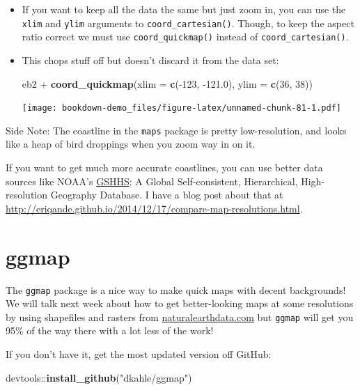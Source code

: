 \documentclass[]{book}
\newenvironment{Shaded}{\begin{snugshade}}{\end{snugshade}}
\newcommand{\KeywordTok}[1]{\textcolor[rgb]{0.13,0.29,0.53}{\textbf{{#1}}}}
\newcommand{\DataTypeTok}[1]{\textcolor[rgb]{0.13,0.29,0.53}{{#1}}}
\newcommand{\DecValTok}[1]{\textcolor[rgb]{0.00,0.00,0.81}{{#1}}}
\newcommand{\FloatTok}[1]{\textcolor[rgb]{0.00,0.00,0.81}{{#1}}}
\newcommand{\StringTok}[1]{\textcolor[rgb]{0.31,0.60,0.02}{{#1}}}
\newcommand{\NormalTok}[1]{{#1}}
\theoremstyle{definition}
\theoremstyle{definition}
\theoremstyle{remark}
\begin{document}
\begin{itemize}
\item
  If you want to keep all the data the same but just zoom in, you can
  use the \texttt{xlim} and \texttt{ylim} arguments to
  \texttt{coord\_cartesian()}. Though, to keep the aspect ratio correct
  we must use \texttt{coord\_quickmap()} instead of
  \texttt{coord\_cartesian()}.
\item
  This chops stuff off but doesn't discard it from the data set:

\begin{Shaded}
\begin{Highlighting}[]
\NormalTok{eb2 +}\StringTok{ }\KeywordTok{coord_quickmap}\NormalTok{(}\DataTypeTok{xlim =} \KeywordTok{c}\NormalTok{(-}\DecValTok{123}\NormalTok{, -}\FloatTok{121.0}\NormalTok{),  }\DataTypeTok{ylim =} \KeywordTok{c}\NormalTok{(}\DecValTok{36}\NormalTok{, }\DecValTok{38}\NormalTok{))}
\end{Highlighting}
\end{Shaded}

  \texttt{[image: bookdown-demo\_files/figure-latex/unnamed-chunk-81-1.pdf]}
\end{itemize}

Side Note: The coastline in the \texttt{maps} package is pretty
low-resolution, and looks like a heap of bird droppings when you zoom
way in on it.

If you want to get much more accurate coastlines, you can use better
data sources like NOAA's
\href{https://www.ngdc.noaa.gov/mgg/shorelines/gshhs.html}{GSHHS}: A
Global Self-consistent, Hierarchical, High-resolution Geography
Database. I have a blog post about that at
\url{http://eriqande.github.io/2014/12/17/compare-map-resolutions.html}.

\section{ggmap}\label{ggmap-hooray}

The \texttt{ggmap} package is a nice way to make quick maps with decent
backgrounds! We will talk next week about how to get better-looking maps
at some resolutions by using shapefiles and rasters from
\url{naturalearthdata.com} but \texttt{ggmap} will get you 95\% of the
way there with a lot less of the work!

If you don't have it, get the most updated version off GitHub:

\begin{Shaded}
\begin{Highlighting}[]
\NormalTok{devtools::}\KeywordTok{install_github}\NormalTok{(}\StringTok{"dkahle/ggmap"}\NormalTok{)}
\end{Highlighting}
\end{Shaded}
\end{document}
